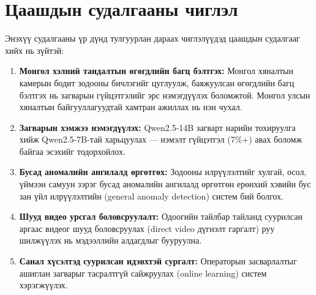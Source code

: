 \section{Цаашдын судалгааны чиглэл}

Энэхүү судалгааны үр дүнд тулгуурлан дараах чиглэлүүдэд цаашдын судалгааг хийх нь зүйтэй:

\begin{enumerate}
    \item \textbf{Монгол хэлний тандалтын өгөгдлийн багц бэлтгэх:} Монгол хяналтын камерын бодит зодооны бичлэгийг цуглуулж, баяжуулсан өгөгдлийн багц бэлтгэх нь загварын гүйцэтгэлийг эрс нэмэгдүүлэх боломжтой. Монгол улсын хяналтын байгууллагуудтай хамтран ажиллах нь нэн чухал.

    \item \textbf{Загварын хэмжээ нэмэгдүүлэх:} Qwen2.5-14B загварт нарийн тохируулга хийж Qwen2.5-7B-тай харьцуулах --- нэмэлт гүйцэтгэл (7\%+) авах боломж байгаа эсэхийг тодорхойлох.

    \item \textbf{Бусад аномалийн ангилалд өргөтгөх:} Зодооны илрүүлэлтийг хулгай, осол, үймээн самуун зэрэг бусад аномалийн ангилалд өргөтгөн ерөнхий хэвийн бус зан үйл илрүүлэлтийн (general anomaly detection) систем бий болгох.

    \item \textbf{Шууд видео урсгал боловсруулалт:} Одоогийн тайлбар тайланд суурилсан аргаас видеог шууд боловсруулах (direct video дүгнэлт гаргалт) руу шилжүүлэх нь мэдээллийн алдагдлыг бууруулна.

    \item \textbf{Санал хүсэлтэд суурилсан идэвхтэй сургалт:} Операторын засварлалтыг ашиглан загварыг тасралтгүй сайжруулах (online learning) систем хэрэгжүүлэх.
\end{enumerate}
